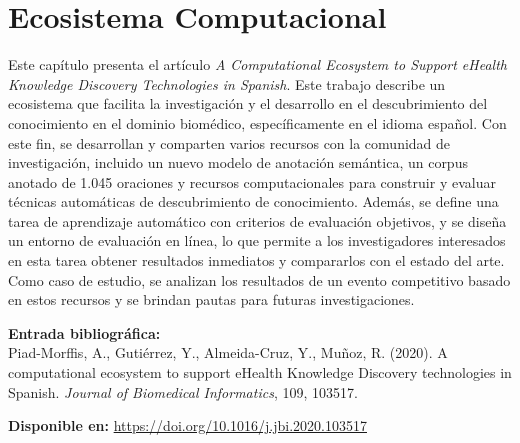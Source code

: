 
\chapter[Ecosistema Computacional: \textit{A Computational Ecosystem to Support eHealth Knowledge Discovery Technologies in Spanish}]{Ecosistema Computacional}
\label{Chap:CorpusV2}

Este capítulo presenta el artículo \textit{A Computational Ecosystem to Support eHealth Knowledge Discovery Technologies in Spanish}. Este trabajo describe un ecosistema que facilita la investigación y el desarrollo en el descubrimiento del conocimiento en el dominio biomédico, específicamente en el idioma español. Con este fin, se desarrollan y comparten varios recursos con la comunidad de investigación, incluido un nuevo modelo de anotación semántica, un corpus anotado de 1.045 oraciones y recursos computacionales para construir y evaluar técnicas automáticas de descubrimiento de conocimiento. Además, se define una tarea de aprendizaje automático con criterios de evaluación objetivos, y se diseña un entorno de evaluación en línea, lo que permite a los investigadores interesados en esta tarea obtener resultados inmediatos y compararlos con el estado del arte. Como caso de estudio, se analizan los resultados de un evento competitivo basado en estos recursos y se brindan pautas para futuras investigaciones.

\BlankLine
\noindent \textbf{Entrada bibliográfica:}\\
Piad-Morffis, A., Gutiérrez, Y., Almeida-Cruz, Y., Muñoz, R. (2020). A computational ecosystem to support eHealth Knowledge Discovery technologies in Spanish. \textit{Journal of Biomedical Informatics}, 109, 103517.

\BlankLine
\noindent \textbf{Disponible en:} \url{https://doi.org/10.1016/j.jbi.2020.103517}
